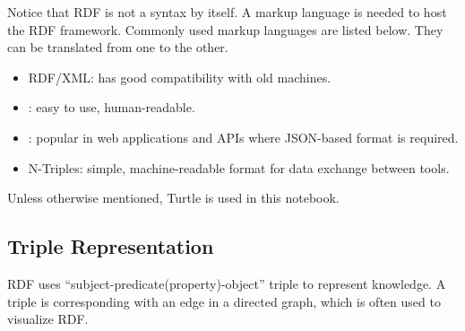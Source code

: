 Notice that RDF is not a syntax by itself. A markup language is needed to host the RDF framework. Commonly used markup languages are listed below. They can be translated from one to the other.
\begin{itemize}
  \item RDF/XML: has good compatibility with old machines.
  \item {}: easy to use, human-readable.
  \item {}: popular in web applications and APIs where JSON-based format is required.
  \item N-Triples: simple, machine-readable format for data exchange between tools.
\end{itemize}
Unless otherwise mentioned, Turtle is used in this notebook.

\subsection{Triple Representation}

RDF uses ``subject-predicate(property)-object'' triple to represent knowledge. A triple is corresponding with an edge in a directed graph, which is often used to visualize RDF. 

